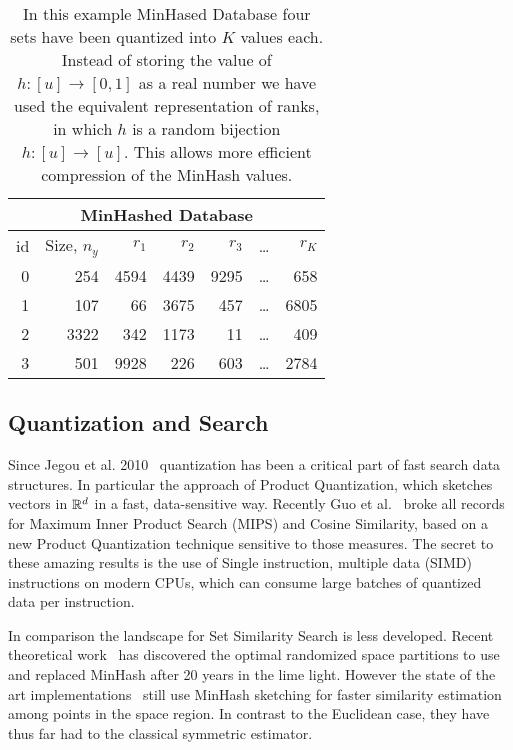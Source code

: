 \begin{table}
\centering
 \begin{tabular}{|r|r| r r r r r|} 
 \hline
     \multicolumn{7}{|c|}{MinHashed Database} \\
 \hline
 id & Size, $n_y$  & $r_1$ & $r_2$ & $r_3$ & \dots & $r_K$ \\
 \hline
 0 & 254 & 4594 & 4439 & 9295 & \dots & 658  \\
 1 & 107 & 66 & 3675 & 457 &     \dots & 6805  \\
 2 & 3322 & 342 & 1173 & 11 &    \dots & 409  \\
 3 & 501 & 9928 & 226 & 603 &    \dots & 2784  \\
  \hline
 \end{tabular}
 \caption{In this example MinHased Database four sets have been quantized into $K$ values each.
    Instead of storing the value of $h:[u]\to[0,1]$ as a real number we have used the equivalent representation of ranks, in which $h$ is a random bijection $h:[u]\to[u]$.
    This allows more efficient compression of the MinHash values.
 }
 \label{tab:minhash-example}
\end{table}





\subsection{Quantization and Search}

Since Jegou et al. 2010~\cite{jegou2010product} quantization has been a critical part of fast search data structures.
In particular the approach of Product Quantization, which sketches vectors in $\mathbb{R}^d$ in a fast, data-sensitive way.
Recently Guo et al.~\cite{guo2020accelerating} broke all records~\cite{aumuller2017ann} for Maximum Inner Product Search (MIPS) and Cosine Similarity, based on a new Product Quantization technique sensitive to those measures.
The secret to these amazing results is the use of Single instruction, multiple data (SIMD) instructions on modern CPUs, which can consume large batches of quantized data per instruction.

In comparison the landscape for Set Similarity Search is less developed.
Recent theoretical work~\cite{christiani2017set, DBLP:conf/focs/AhleK20} has discovered the optimal randomized space partitions to use and replaced MinHash after 20 years in the lime light.
However the state of the art implementations~\cite{christiani2018scalable} still use MinHash sketching for faster similarity estimation among points in the space region.
In contrast to the Euclidean case, they have thus far had to the classical symmetric estimator.


